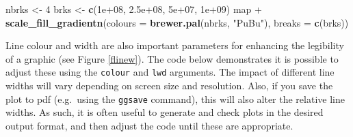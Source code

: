 \documentclass[]{article}
\newenvironment{Shaded}{}{}
\newcommand{\KeywordTok}[1]{\textcolor[rgb]{0.00,0.44,0.13}{\textbf{{#1}}}}
\newcommand{\DataTypeTok}[1]{\textcolor[rgb]{0.56,0.13,0.00}{{#1}}}
\newcommand{\DecValTok}[1]{\textcolor[rgb]{0.25,0.63,0.44}{{#1}}}
\newcommand{\FloatTok}[1]{\textcolor[rgb]{0.25,0.63,0.44}{{#1}}}
\newcommand{\StringTok}[1]{\textcolor[rgb]{0.25,0.44,0.63}{{#1}}}
\newcommand{\NormalTok}[1]{{#1}}
\begin{document}
\begin{Shaded}
\begin{Highlighting}[]
\NormalTok{nbrks <- }\DecValTok{4}
\NormalTok{brks <- }\KeywordTok{c}\NormalTok{(}\FloatTok{1e+08}\NormalTok{, }\FloatTok{2.5e+08}\NormalTok{, }\FloatTok{5e+07}\NormalTok{, }\FloatTok{1e+09}\NormalTok{)}
\NormalTok{map + }\KeywordTok{scale_fill_gradientn}\NormalTok{(}\DataTypeTok{colours =} \KeywordTok{brewer.pal}\NormalTok{(nbrks, }\StringTok{"PuBu"}\NormalTok{), }\DataTypeTok{breaks =} \KeywordTok{c}\NormalTok{(brks))}
\end{Highlighting}
\end{Shaded}


Line colour and width are also important parameters for enhancing the legibility of a graphic (see Figure \ref{flinew}). The code below demonstrates it
is possible to adjust these using the \texttt{colour} and \texttt{lwd}
arguments. The impact of different line widths will vary depending on screen size and resolution. Also, if you save the plot to pdf (e.g.~using
the \texttt{ggsave} command), this will also alter the relative line widths. As such, it is often useful to generate and check plots in the desired output format, and then adjust the code until these
are appropriate.
\end{document}
